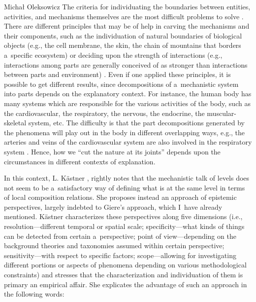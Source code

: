 \begin{artengenv}{Michał Oleksowicz}
The criteria for individuating the boundaries between entities, activities, and mechanisms themselves are the most difficult problems to solve
\parencite[][]{glennan_components_2017}. %
 There are different principles that may be of help in carving the mechanisms and their components, such as the individuation of natural boundaries of biological objects (e.g., the cell membrane, the skin, the chain of mountains that borders a~specific ecosystem) 
\parencite[][]{darden_thinking_2008} %
 or deciding upon the strength of interactions (e.g., interactions among parts are generally conceived of as stronger than interactions between parts and environment) 
\parencite[][]{wimsatt_complexity_1974}. %
 Even if one applied these principles, it is possible to get different results, since decompositions of a~mechanistic system into parts depends on the explanatory context. For instance, the human body has many systems which are responsible for the various activities of the body, such as the cardiovascular, the respiratory, the nervous, the endocrine, the muscular-skeletal system, etc. The difficulty is that the part decompositions generated by the phenomena will play out in the body in different overlapping ways, e.g., the arteries and veins of the cardiovascular system are also involved in the respiratory system 
\parencite[][pp.37–38]{glennan_components_2017}. %
 Hence, how we ``cut the nature at its joints'' depends upon the circumstances in different contexts of explanation.

In this context, L. Kästner
\parencite*{kastner_integrating_2018}, %
rightly notes that the mechanistic talk of levels does not seem to be a~satisfactory way of defining what is at the same level in terms of local composition relations. She proposes instead an approach of epistemic perspectives, largely indebted to Giere's
\parencite*[][]{giere_scientific_2006} %
 approach, which I~have already mentioned. Kästner characterizes these perspectives along five dimensions (i.e., resolution---different temporal or spatial scale; specificity---what kinds of things can be detected from certain a~perspective; point of view---depending on the background theories and taxonomies assumed within certain perspective; sensitivity---with respect to specific factors; scope---allowing for investigating different portions or aspects of phenomena depending on various methodological constraints) and stresses that the characterization and individuation of them is primary an empirical affair. She explicates the advantage of such an approach in the following words:


\end{artengenv}
